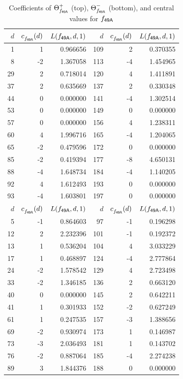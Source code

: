 \begin{table}
\begin{tabular}{||r|rr||r|rr||}
\hline
$d$ & $c^{}_{f_\mathsf{{49A}}}(d)$ & $L(f_\mathsf{{49A}},d,1)$& $d$ & $c^{}_{f_\mathsf{{49A}}}(d)$ & $L(f_\mathsf{{49A}},d,1)$\\
\hline
   1 & 1 & 0.966656 & 109 & 2 & 0.370355 \\
   8 & -2 & 1.367058 & 113 & -4 & 1.454965 \\
   29 & 2 & 0.718014 & 120 & 4 & 1.411891 \\
   37 & 2 & 0.635669 & 137 & 2 & 0.330348 \\
   44 & 0 & 0.000000 & 141 & -4 & 1.302514 \\
   53 & 0 & 0.000000 & 149 & 0 & 0.000000 \\
   57 & 0 & 0.000000 & 156 & 4 & 1.238311 \\
   60 & 4 & 1.996716 & 165 & -4 & 1.204065 \\
   65 & -2 & 0.479596 & 172 & 0 & 0.000000 \\
   85 & -2 & 0.419394 & 177 & -8 & 4.650131 \\
   88 & -4 & 1.648734 & 184 & -4 & 1.140205 \\
   92 & 4 & 1.612493 & 193 & 0 & 0.000000 \\
   93 & -4 & 1.603801 & 197 & 0 & 0.000000 \\
\hline
$d$ & $c^{}_{f_\mathsf{{49A}}}(d)$ & $L(f_\mathsf{{49A}},d,1)$& $d$ & $c^{}_{f_\mathsf{{49A}}}(d)$ & $L(f_\mathsf{{49A}},d,1)$\\
\hline
   5 & -1 & 0.864603 & 97 & -1 & 0.196298 \\
   12 & 2 & 2.232396 & 101 & -1 & 0.192372 \\
   13 & 1 & 0.536204 & 104 & 4 & 3.033229 \\
   17 & 1 & 0.468897 & 124 & -4 & 2.777864 \\
   24 & -2 & 1.578542 & 129 & 4 & 2.723498 \\
   33 & -2 & 1.346185 & 136 & 2 & 0.663120 \\
   40 & 0 & 0.000000 & 145 & 2 & 0.642211 \\
   41 & 1 & 0.301933 & 152 & -2 & 0.627249 \\
   61 & 1 & 0.247535 & 157 & -3 & 1.388656 \\
   69 & -2 & 0.930974 & 173 & 1 & 0.146987 \\
   73 & -3 & 2.036493 & 181 & 1 & 0.143702 \\
   76 & -2 & 0.887064 & 185 & -4 & 2.274238 \\
   89 & 3 & 1.844376 & 188 & 0 & 0.000000 \\
\hline
\end{tabular}
\caption{Coefficients of
${\Theta}^+_{f_\mathsf{{49A}}}$ (top),
${\Theta}^-_{f_\mathsf{{49A}}}$ (bottom), and central values for $f_\mathsf{{49A}}$
          \label{table:dlcs:49A}}
\end{table}
